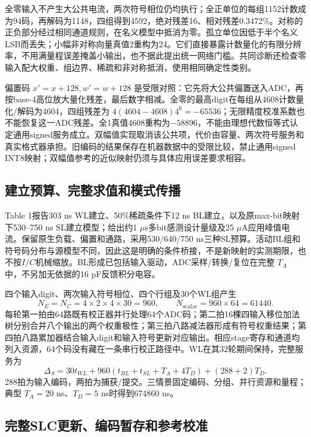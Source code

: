

全零输入不产生大公共电流，两次符号相位仍均执行；全正单位的每组1152计数成为94码，再解码为1148，四组得到4592，绝对残差16、相对残差0.3472\%。对称的正负部分经过相同通道规则，在名义模型中抵消为零。孤立单位因低于半个名义LSB而丢失；小幅非对称向量真值2重构为24。它们直接暴露计数量化的有限分辨率，不用满量程误差掩盖小输出，也不据此提出统一网络门槛。共同诊断还检查零输入配大权重、组边界、稀疏和非对称抵消，使用相同确定性类别。

偏置码 $x'=x+128,w'=w+128$ 是受限对照：它先将大公共偏置送入ADC，再按base-4高位放大量化残差，最后数字相减。全零的最高digit在每组从4608计数量化/解码为4604，四组残差为 $4(4604-4608)4^6=-65536$；无限精度校准系数也不能恢复这一ADC残差。全1真值4608重构为$-58896$，不能由理想代数恒等式认定通用signed服务成立。双幅值实现取消该公共项，代价由容量、两次符号服务和真实格式器承担。旧编码的结果保存在机器数据中的受限比较，禁止通用signed INT8映射；双幅值参考的近似映射仍须与具体应用误差要求相容。

\subsection{建立预算、完整求值和模式传播}

 Table 1报告303 ns WL建立、50\%稀疏条件下12 ns BL建立，以及原max-bit映射下530--750 ns SL建立模型；给出约1 $\mu$s多bit感测设计量级及25 $\mu$A应用峰值电流。保留原生负载、偏置和通路，采用530/640/750 ns三种SL预算。活动BL组和符号码分布与源模型不同，因此这是明确的条件桥接，不是新映射的实测期限，也不按$I/C$机械缩放。BL形成已包括输入驱动，ADC采样/转换/复位在完整 $T_A$ 中，不另加无依据的16 pF反馈积分电容。
\cite{nand04,nand05}

四个输入digit、两次输入符号相位、四个行组及30个WL组产生
\[
 N_E=N_C=4\times2\times4\times30=960,\qquad
 N_{\mathrm{scalar}}=960\times64=61440.
\]
每轮第一拍由64路既有校正器并行处理64个ADC码；第二拍16棵四输入移位加法树分别合并八个输出的两个权重极性；第三拍八路减法器形成有符号权重结果；第四拍八路累加器结合输入digit和输入符号更新对应输出。相应stage寄存和通道均列入资源，64个码没有藏在一条串行校正路径中。WL在其32轮期间保持，完整服务为
\begin{equation}
 \Delta_S=30t_{WL}+960(t_{BL}+t_{SL}+T_A+4T_D)+(288+2)T_D.
 \label{04_nand_3d:eq:stream}
\end{equation}
288拍为输入编码，两拍为捕获/提交。三情景固定编码、分组、并行资源和量程；典型 $T_A=20$ ns、$T_D=5$ ns时得到674860 ns。

\subsection{完整SLC更新、编码暂存和参考校准}

